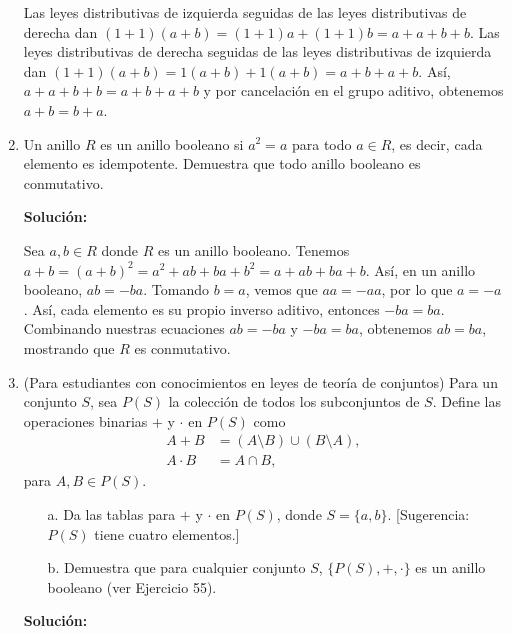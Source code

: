 \begin{enumerate}
	Las leyes distributivas de izquierda seguidas de las leyes distributivas de derecha dan $(1 + 1)(a + b) = (1 + 1)a + (1 + 1)b = a + a + b + b$. Las leyes distributivas de derecha seguidas de las leyes distributivas de izquierda dan $(1 + 1)(a + b) = 1(a + b) + 1(a + b) = a + b + a + b$. Así, $a + a + b + b = a + b + a + b$ y por cancelación en el grupo aditivo, obtenemos $a + b = b + a$.
	
	\item
	
	Un anillo $R$ es un anillo booleano si $a^2 = a$ para todo $a \in R$, es decir, cada elemento es idempotente. Demuestra que todo anillo booleano es conmutativo.
	
	\textbf{Solución:}
	
	Sea $a, b \in R$ donde $R$ es un anillo booleano. Tenemos $a + b = (a + b)^2 = a^2 + ab + ba + b^2 = a + ab + ba + b$. Así, en un anillo booleano, $ab = -ba$. Tomando $b = a$, vemos que $aa = -aa$, por lo que $a = -a$. Así, cada elemento es su propio inverso aditivo, entonces $-ba = ba$. Combinando nuestras ecuaciones $ab = -ba$ y $-ba = ba$, obtenemos $ab = ba$, mostrando que $R$ es conmutativo.
	
	
	\item
	
	(Para estudiantes con conocimientos en leyes de teoría de conjuntos) Para un conjunto $S$, sea $P(S)$ la colección de todos los subconjuntos de $S$. Define las operaciones binarias $+$ y $\cdot$ en $P(S)$ como
	\begin{align*}
		A + B &= (A \setminus B) \cup (B \setminus A), \\
		A \cdot B &= A \cap B,
	\end{align*}
	para $A, B \in P(S)$.
	\begin{enumerate}
		\item[a.] Da las tablas para $+$ y $\cdot$ en $P(S)$, donde $S = \{a, b\}$. [Sugerencia: $P(S)$ tiene cuatro elementos.]
		\item[b.] Demuestra que para cualquier conjunto $S$, $\{P(S), +, \cdot\}$ es un anillo booleano (ver Ejercicio 55).
	\end{enumerate}
	\textbf{Solución:}
	

\end{enumerate}
